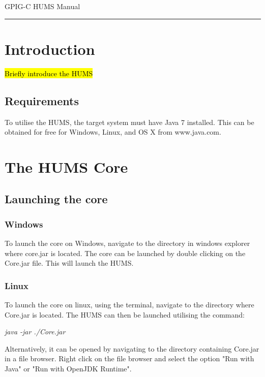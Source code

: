 \documentclass[10pt,a4paper]{article}
\begin{document}
\begin{center}
{\vspace*{-0.7cm}
\Huge GPIG-C HUMS Manual}
\vspace*{0.3cm}

\end{center}
\vspace*{0.4cm}
\hrule
\vspace*{0.4cm}

\tableofcontents

\section{Introduction}

\hl{Briefly introduce the HUMS}

\subsection{Requirements}

To utilise the HUMS, the target system must have Java 7 installed. This can be obtained for free for Windows, Linux, and OS X from www.java.com.

\section{The HUMS Core}
\label{sec:launching}

\subsection{Launching the core}
\subsubsection{Windows}
To launch the core on Windows, navigate to the directory in windows explorer where core.jar is located. The core can be launched by double clicking on the Core.jar file. This will launch the HUMS.
\subsubsection{Linux}
To launch the core on linux, using the terminal, navigate to the directory where Core.jar is located. The HUMS can then be launched utilising the command:
\begin{center}
\textit{java -jar ./Core.jar}
\end{center}
Alternatively, it can be opened by navigating to the directory containing Core.jar in a file browser. Right click on the file browser and select the option "Run with Java" or "Run with OpenJDK Runtime".
\end{document}
